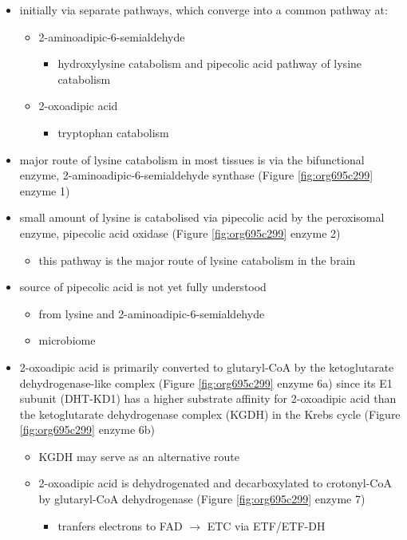 \documentclass[12pt]{scrartcl}
\begin{document}
\begin{center}
\begin{center}
\begin{itemize}
\item initially via separate pathways, which converge into a common 
pathway at:
\begin{itemize}
\item 2-aminoadipic-6-semialdehyde
\begin{itemize}
\item hydroxylysine catabolism and pipecolic acid pathway of lysine
catabolism
\end{itemize}
\item 2-oxoadipic acid
\begin{itemize}
\item tryptophan catabolism
\end{itemize}
\end{itemize}
\item major route of lysine catabolism in most tissues is via the
bifunctional enzyme, 2-aminoadipic-6-semialdehyde synthase (Figure \ref{fig:org695c299} enzyme 1)
\item small amount of lysine is catabolised via pipecolic acid by the
peroxisomal enzyme, pipecolic acid oxidase (Figure \ref{fig:org695c299} enzyme 2)
\begin{itemize}
\item this pathway is the major route of lysine catabolism in the
brain
\end{itemize}
\item source of pipecolic acid is not yet fully understood
\begin{itemize}
\item from lysine and 2-aminoadipic-6-semialdehyde
\item microbiome
\end{itemize}
\item 2-oxoadipic acid is primarily converted to glutaryl-CoA by the
ketoglutarate dehydrogenase-like complex (Figure \ref{fig:org695c299} enzyme 6a)
since its E1 subunit (DHT-KD1) has a higher substrate affinity for
2-oxoadipic acid than the ketoglutarate dehydrogenase complex (KGDH) in
the Krebs cycle (Figure \ref{fig:org695c299} enzyme 6b)
\begin{itemize}
\item KGDH may serve as an alternative route
\item 2-oxoadipic acid is dehydrogenated and decarboxylated to
crotonyl-CoA by glutaryl-CoA dehydrogenase (Figure \ref{fig:org695c299} enzyme 7)
\begin{itemize}
\item tranfers electrons to FAD \(\to\) ETC via ETF/ETF-DH

\end{itemize}
\end{itemize}
\end{itemize}
\end{center}
\end{center}
\end{document}
